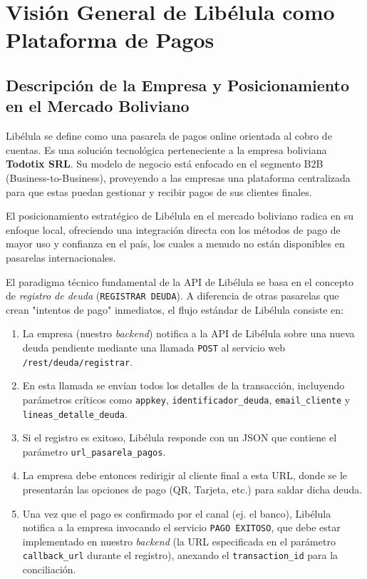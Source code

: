 \section{Visión General de Libélula como Plataforma de Pagos}

    \subsection{Descripción de la Empresa y Posicionamiento en el Mercado Boliviano}
        Libélula se define como una pasarela de pagos online orientada al cobro de cuentas. Es una solución tecnológica perteneciente 
        a la empresa boliviana \textbf{Todotix SRL}. Su modelo de negocio está enfocado en el segmento B2B (Business-to-Business), 
        proveyendo a las empresas una plataforma centralizada para que estas puedan gestionar y recibir pagos de sus clientes finales.\par

        El posicionamiento estratégico de Libélula en el mercado boliviano radica en su enfoque local, ofreciendo una integración 
        directa con los métodos de pago de mayor uso y confianza en el país, los cuales a menudo no están disponibles en pasarelas 
        internacionales.\par

        El paradigma técnico fundamental de la API de Libélula se basa en el concepto de \emph{registro de deuda} (\texttt{REGISTRAR DEUDA}). 
        A diferencia de otras pasarelas que crean "intentos de pago" inmediatos, el flujo estándar de Libélula consiste en:\par

        \begin{enumerate}
            \item La empresa (nuestro \emph{backend}) notifica a la API de Libélula sobre una nueva deuda pendiente mediante una llamada \texttt{POST} al servicio web \texttt{/rest/deuda/registrar}.
            \item En esta llamada se envían todos los detalles de la transacción, incluyendo parámetros críticos como \texttt{appkey}, \texttt{identificador\_deuda}, \texttt{email\_cliente} y \texttt{lineas\_detalle\_deuda}.
            \item Si el registro es exitoso, Libélula responde con un JSON que contiene el parámetro \texttt{url\_pasarela\_pagos}.
            \item La empresa debe entonces redirigir al cliente final a esta URL, donde se le presentarán las opciones de pago (QR, Tarjeta, etc.) para saldar dicha deuda.
            \item Una vez que el pago es confirmado por el canal (ej. el banco), Libélula notifica a la empresa invocando el servicio \texttt{PAGO EXITOSO}, que debe estar implementado en nuestro \emph{backend} (la URL especificada en el parámetro \texttt{callback\_url} durante el registro), anexando el \texttt{transaction\_id} para la conciliación.
        \end{enumerate}

